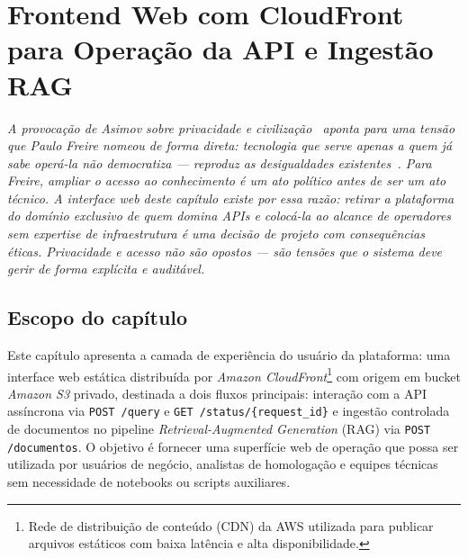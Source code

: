 \chapter{Frontend Web com CloudFront para Operação da API e Ingestão RAG}
\label{chap:frontend_cloudfront_console}

{\small\itshape\color{AccentGray}
A provoca\c{c}\~{a}o de Asimov sobre privacidade e civiliza\c{c}\~{a}o~\cite{asimov1982foundationsedge} aponta para uma tens\~{a}o que Paulo Freire nomeou de forma direta: tecnologia que serve apenas a quem j\'{a} sabe oper\'{a}-la n\~{a}o democratiza --- reproduz as desigualdades existentes~\cite{freire1996autonomia}. Para Freire, ampliar o acesso ao conhecimento \'{e} um ato pol\'{i}tico antes de ser um ato t\'{e}cnico. A interface \textit{web} deste cap\'{i}tulo existe por essa raz\~{a}o: retirar a plataforma do dom\'{i}nio exclusivo de quem domina APIs e coloc\'{a}-la ao alcance de operadores sem expertise de infraestrutura \'{e} uma decis\~{a}o de projeto com consequ\^{e}ncias \'{e}ticas. Privacidade e acesso n\~{a}o s\~{a}o opostos --- s\~{a}o tens\~{o}es que o sistema deve gerir de forma expl\'{i}cita e audit\'{a}vel.\par}
\vspace{0.6em}
\section{Escopo do cap\'itulo}

Este cap\'itulo apresenta a camada de experi\^encia do usu\'ario da
plataforma: uma interface web est\'atica distribu\'ida por
\textit{Amazon CloudFront}\footnote{%
  Rede de distribui\c{c}\~ao de conte\'udo (CDN) da AWS utilizada para
  publicar arquivos est\'aticos com baixa lat\^encia e alta disponibilidade.}
com origem em bucket \textit{Amazon S3} privado,
destinada a dois fluxos principais: intera\c{c}\~ao com a API ass\'incrona
via \texttt{POST /query} e \texttt{GET /status/\{request\_id\}} e ingest\~ao
controlada de documentos no pipeline \textit{Retrieval-Augmented Generation}
(RAG) via \texttt{POST /documentos}. O objetivo \'e
fornecer uma superf\'icie web de opera\c{c}\~ao que possa ser utilizada por
usu\'arios de neg\'ocio, analistas de homologa\c{c}\~ao e equipes t\'ecnicas sem
necessidade de notebooks ou scripts auxiliares.

